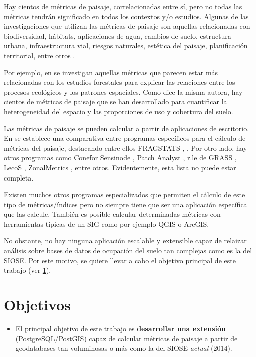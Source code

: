 Hay cientos de métricas de paisaje, correlacionadas entre sí, pero no todas las métricas tendrán significado en todos los contextos y/o estudios. Algunas de las investigaciones que utilizan las métricas de paisaje son aquellas relacionadas con biodiversidad, hábitats, aplicaciones de agua, cambios de suelo, estructura urbana, infraestructura vial, riesgos naturales, estética del paisaje, planificación territorial, entre otros \cite{Uuemaa2009}.

Por ejemplo, en \cite{Uuemaa2017} se investigan aquellas métricas que parecen estar más relacionadas con los estudios forestales para explicar las relaciones entre los procesos ecológicos y los patrones espaciales. Como dice la misma autora, hay cientos de métricas de paisaje que se han desarrollado para cuantificar la heterogeneidad del espacio y las proporciones de uso y cobertura del suelo.

Las métricas de paisaje se pueden calcular a partir de aplicaciones de escritorio. En \cite{Zaragozi2012} se establece una comparativa entre programas específicos para el cálculo de métricas del paisaje, destacando entre ellos FRAGSTATS \cite{McGarigal1994}, \cite{McGarigal2015}. Por otro lado, hay otros programas como Conefor Sensinode \cite{Saura2009}, Patch Analyst \cite{Zaragozi2012}, r.le de GRASS \cite{Baker1992}, LecoS \cite{Jung2016}, ZonalMetrics \cite{Adamczyk2017}, entre otros. Evidentemente, esta lista no puede estar completa. 

Existen muchos otros programas especializados que permiten el cálculo de este tipo de métricas/índices pero no siempre tiene que ser una aplicación específica que las calcule. También es posible calcular determinadas métricas con herramientas típicas de un SIG como por ejemplo QGIS o ArcGIS.

No obstante, no hay ninguna aplicación escalable y extensible capaz de relaizar análisis sobre bases de datos de ocupación del suelo tan complejas como es la del SIOSE. Por este motivo, se quiere llevar a cabo el objetivo principal de este trabajo (ver \ref{sec:objetivos}).


\section{Objetivos}\label{sec:objetivos}

\begin{graybox}
\begin{itemize}
\item El principal objetivo de este trabajo es \textbf{desarrollar una extensión} (PostgreSQL/PostGIS) capaz de calcular métricas de paisaje a partir de geodatabases tan voluminosas o más como la del SIOSE \textit{actual} (2014).
\end{itemize}
\end{graybox}

